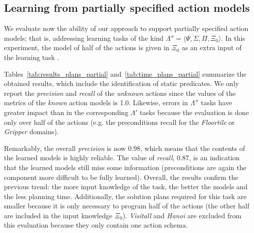 \documentclass[letterpaper]{article} %
\newcommand{\tup}[1]{{\langle #1 \rangle}}
\begin{document}
\subsection{Learning from partially specified action models}

We evaluate now the ability of our approach to support partially specified action models; that is, addressing learning tasks of the kind $\Lambda''=\tup{\Psi,\Sigma,\Pi,\Xi_0}$. In this experiment, the model of half of the actions is given in $\Xi_0$ as an extra input of the learning task .

Tables~\ref{tab:results_plans_partial} and~\ref{tab:time_plans_partial} summarize the obtained results, which include the identification of static predicates. We only report the {\em precision} and {\em recall} of the {\em unknown} actions since the values of the metrics of the {\em known} action models is 1.0. Likewise, errors in $\Lambda''$ tasks have greater impact than in the corresponding $\Lambda'$ tasks because the evaluation is done only over half of the actions (e.g. the preconditions recall for the {\em Floortile} or {\em Gripper} domains).

Remarkably, the overall \emph{precision} is now $0.98$, which means that the contents of the learned models is highly reliable. The value of \emph{recall}, 0.87, is an indication that the learned models still miss some information (preconditions are again the component more difficult to be fully learned). Overall, the results confirm the previous trend: the more input knowledge of the task, the better the models and the less planning time. Additionally, the solution plans required for this task are smaller because it is only necessary to program half of the actions (the other half are included in the input knowledge $\Xi_0$). {\em Visitall} and {\em Hanoi} are excluded from this evaluation because they only contain one action schema.

\end{document}
